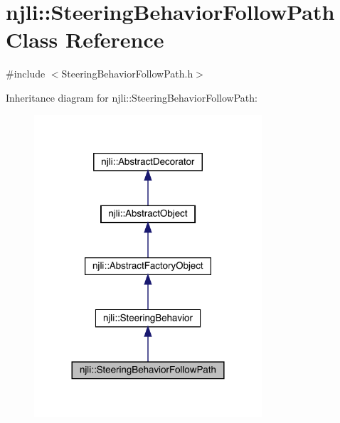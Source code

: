 \hypertarget{classnjli_1_1_steering_behavior_follow_path}{}\section{njli\+:\+:Steering\+Behavior\+Follow\+Path Class Reference}
\label{classnjli_1_1_steering_behavior_follow_path}


{\ttfamily \#include $<$Steering\+Behavior\+Follow\+Path.\+h$>$}



Inheritance diagram for njli\+:\+:Steering\+Behavior\+Follow\+Path\+:\nopagebreak
\begin{figure}[H]
\begin{center}
\leavevmode
\includegraphics[width=240pt]{classnjli_1_1_steering_behavior_follow_path__inherit__graph}
\end{center}
\end{figure}


